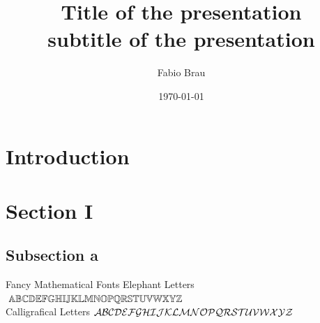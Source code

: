 \documentclass[aspectratio=169, 10pt]{beamer}
\title{Title of the presentation\\ 
  \large{subtitle of the presentation}}
\date{\today}
\author{Fabio Brau}
\institute{SSSA, Emerging Digital Technologies, Pisa.}
\theoremstyle{definition}
\begin{document}
{%
\maketitle
}
\begin{frame}
  \tableofcontents
\end{frame}
\section{Introduction}
\section{Section I}
\subsection{Subsection a}
\begin{frame}{Fancy Mathematical Fonts}
Elephant Letters\hfill
  \(
    \mathbb{A}
    \mathbb{B}
    \mathbb{C}
    \mathbb{D}
    \mathbb{E}
    \mathbb{F}
    \mathbb{G}
    \mathbb{H}
    \mathbb{I}
    \mathbb{J}
    \mathbb{K}
    \mathbb{L}
    \mathbb{M}
    \mathbb{N}
    \mathbb{O}
    \mathbb{P}
    \mathbb{Q}
    \mathbb{R}
    \mathbb{S}
    \mathbb{T}
    \mathbb{U}
    \mathbb{V}
    \mathbb{W}
    \mathbb{X}
    \mathbb{Y}
    \mathbb{Z}
  \)\\


  Calligrafical Letters\hfill
  \(
    \mathcal{A}
    \mathcal{B}
    \mathcal{C}
    \mathcal{D}
    \mathcal{E}
    \mathcal{F}
    \mathcal{G}
    \mathcal{H}
    \mathcal{I}
    \mathcal{J}
    \mathcal{K}
    \mathcal{L}
    \mathcal{M}
    \mathcal{N}
    \mathcal{O}
    \mathcal{P}
    \mathcal{Q}
    \mathcal{R}
    \mathcal{S}
    \mathcal{T}
    \mathcal{U}
    \mathcal{V}
    \mathcal{W}
    \mathcal{X}
    \mathcal{Y}
    \mathcal{Z}
  \)
\end{frame}
\end{document}
